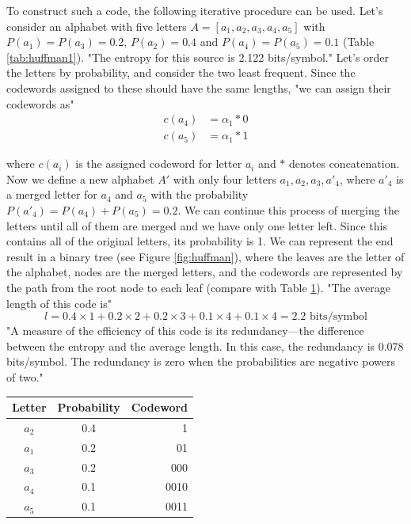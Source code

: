      To construct such a code, the following iterative procedure can be used. Let's consider an alphabet with five letters $A = [a_1,a_2,a_3,a_4,a_5]$ with $P(a_1)=P(a_3)=0.2$, $P(a_2)=0.4$ and $P(a_4)=P(a_5)=0.1$ (Table \ref{tab:huffman1}). "The entropy for this source is 2.122 bits/symbol." Let's order the letters by probability, and consider the two least frequent. Since the codewords assigned to these should have the same lengths, "we can assign their codewords as"
      \begin{align*}
        c(a_4) &= \alpha_1 * 0 \\
        c(a_5) &= \alpha_1 *1
      \end{align*}

      where $c(a_i)$ is the assigned codeword for letter $a_i$ and $*$ denotes concatenation. Now we define a new alphabet $A'$ with only four letters $a_1, a_2, a_3, a'_4$, where $a'_4$ is a merged letter for $a_4$ and $a_5$ with the probability $P(a'_4) = P(a_4) + P(a_5) = 0.2$. We can continue this process of merging the letters until all of them are merged and we have only one letter left. Since this contains all of the original letters, its probability is 1. We can represent the end result in a binary tree (see Figure \ref{fig:huffman}), where the leaves are the letter of the alphabet, nodes are the merged letters, and the codewords are represented by the path from the root node to each leaf (compare with Table \ref{tab:huffman2}). "The average length of this code is"
      \begin{equation}
        l = 0.4\times 1 + 0.2 \times 2 + 0.2 \times 3 + 0.1 \times 4 + 0.1 \times 4 = 2.2 \text{ bits/symbol}
      \end{equation}
      "A measure of the efficiency of this code is its redundancy—the difference between the entropy and the average length. In this case, the redundancy is 0.078 bits/symbol. The redundancy is zero when the probabilities are negative powers of two."

      \begin{table}
        \centering
        \begin{tabular}{ccr}
          \toprule
          Letter & Probability & Codeword \\
          \midrule
          $a_2$ & 0.4 & 1 \\
          $a_1$ & 0.2 & 01 \\
          $a_3$ & 0.2 & 000 \\
          $a_4$ & 0.1 & 0010 \\
          $a_5$ & 0.1 & 0011 \\
          \bottomrule
        \end{tabular}
        \label{tab:huffman2}
      \end{table}


